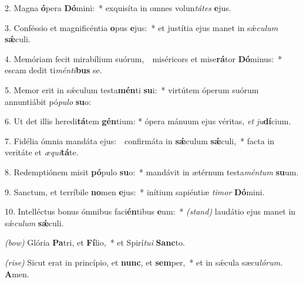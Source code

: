 2. Magna \textbf{ó}pera \textbf{Dó}mini:~*
	exquisíta in omnes volun\textit{tá}\textit{tes} \textbf{e}jus.

3. Conféssio et magnificéntia \textbf{o}pus \textbf{e}jus:~*
	et justítia ejus manet in s\'{\ae}\textit{cu}\textit{lum} \textbf{s\'{\ae}}culi.

4. Memóriam fecit mirabílium suórum,~\GreDagger\
	miséricors et mise\textbf{rá}tor \textbf{Dó}minus:~*
	escam dedit ti\textit{mén}\textit{ti}\textbf{bus} se.

5. Memor erit in s\'{\ae}culum testa\textbf{mén}ti \textbf{su}i:~*
	virtútem óperum suórum annuntiábit pó\textit{pu}\textit{lo} \textbf{su}o:

6. Ut det illis heredi\textbf{tá}tem \textbf{gén}tium: *
	ópera mánuum ejus véritas, \textit{et} \textit{ju}\textbf{dí}\-cium.

7. Fidélia ómnia mandáta ejus:~\GreDagger\
	confirmáta in \textbf{s\'{\ae}}culum \textbf{s\'{\ae}}culi,~*
	facta in veritáte et \textit{æ}\textit{qui}\textbf{tá}te.

8. Redemptiónem misit \textbf{pó}pulo \textbf{su}o:~*
	mandávit in ætérnum testa\textit{mén}\textit{tum} \textbf{su}um.

9. Sanctum, et terríbile \textbf{no}men \textbf{e}jus:~*
	inítium sapiéntiæ \textit{ti}\textit{mor} \textbf{Dó}\-mini.

10. Intelléctus bonus ómnibus faci\textbf{én}tibus \textbf{e}um:~* {\color{red}\textit{(stand)}}
	laudátio ejus manet in s\'{\ae}\textit{cu}\textit{lum} \textbf{s\'{\ae}}culi.

{\color{red}\textit{(bow)}} Glória \textbf{Pa}tri, et \textbf{Fí}lio,~*
	et Spirí\textit{tu}\textit{i} \textbf{Sanc}to.

{\color{red}\textit{(rise)}} Sicut erat in princípio, et \textbf{nunc}, et \textbf{sem}per,~*
	et in s\'{\ae}cula sæcu\textit{ló}\textit{rum}. \textbf{A}men.
